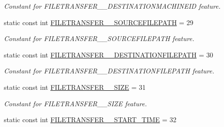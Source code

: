 \begin{DoxyCompactItemize}
\begin{DoxyCompactList}\small\item\em Constant for FILETRANSFER\_\-\_\-DESTINATIONMACHINEID feature. \item\end{DoxyCompactList}\item 
\hypertarget{classFMS__Data_1_1FMS__DataPackage_a94398f1ba44e78270fa5d77a499b1cd3}{
static const int \hyperlink{classFMS__Data_1_1FMS__DataPackage_a94398f1ba44e78270fa5d77a499b1cd3}{FILETRANSFER\_\-\_\-SOURCEFILEPATH} = 29}
\label{classFMS__Data_1_1FMS__DataPackage_a94398f1ba44e78270fa5d77a499b1cd3}

\begin{DoxyCompactList}\small\item\em Constant for FILETRANSFER\_\-\_\-SOURCEFILEPATH feature. \item\end{DoxyCompactList}\item 
\hypertarget{classFMS__Data_1_1FMS__DataPackage_a9f8036668085df4c0f0ba90b53a1045b}{
static const int \hyperlink{classFMS__Data_1_1FMS__DataPackage_a9f8036668085df4c0f0ba90b53a1045b}{FILETRANSFER\_\-\_\-DESTINATIONFILEPATH} = 30}
\label{classFMS__Data_1_1FMS__DataPackage_a9f8036668085df4c0f0ba90b53a1045b}

\begin{DoxyCompactList}\small\item\em Constant for FILETRANSFER\_\-\_\-DESTINATIONFILEPATH feature. \item\end{DoxyCompactList}\item 
\hypertarget{classFMS__Data_1_1FMS__DataPackage_af67832831ea42e22b9e313f3774af78c}{
static const int \hyperlink{classFMS__Data_1_1FMS__DataPackage_af67832831ea42e22b9e313f3774af78c}{FILETRANSFER\_\-\_\-SIZE} = 31}
\label{classFMS__Data_1_1FMS__DataPackage_af67832831ea42e22b9e313f3774af78c}

\begin{DoxyCompactList}\small\item\em Constant for FILETRANSFER\_\-\_\-SIZE feature. \item\end{DoxyCompactList}\item 
\hypertarget{classFMS__Data_1_1FMS__DataPackage_a02fa2f0d812f99560dbc8ddfbe6931cb}{
static const int \hyperlink{classFMS__Data_1_1FMS__DataPackage_a02fa2f0d812f99560dbc8ddfbe6931cb}{FILETRANSFER\_\-\_\-START\_\-TIME} = 32}
\label{classFMS__Data_1_1FMS__DataPackage_a02fa2f0d812f99560dbc8ddfbe6931cb}


\end{DoxyCompactItemize}
